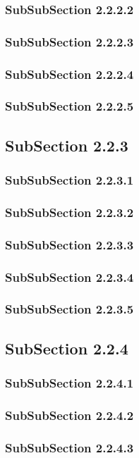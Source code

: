 \subsubsection{SubSubSection 2.2.2.2}
\subsubsection{SubSubSection 2.2.2.3}
\subsubsection{SubSubSection 2.2.2.4}
\subsubsection{SubSubSection 2.2.2.5}
\subsection{SubSection 2.2.3}
\subsubsection{SubSubSection 2.2.3.1}
\subsubsection{SubSubSection 2.2.3.2}
\subsubsection{SubSubSection 2.2.3.3}
\subsubsection{SubSubSection 2.2.3.4}
\subsubsection{SubSubSection 2.2.3.5}
\subsection{SubSection 2.2.4}
\subsubsection{SubSubSection 2.2.4.1}
\subsubsection{SubSubSection 2.2.4.2}
\subsubsection{SubSubSection 2.2.4.3}
